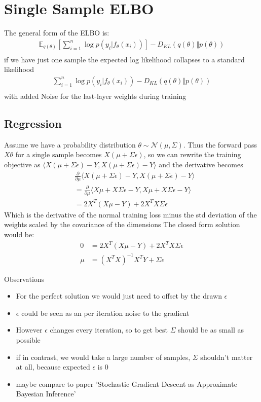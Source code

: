 \documentclass[a4paper]{scrartcl}
\begin{document}
\section{Single Sample ELBO}
  The general form of the ELBO is:
  \begin{align*}
      \mathbb{E}_{q(\theta)}[\sum_{i=1}^n \log{p(y_i \vert f_{\theta}(x_i))}] - D_{KL}(q(\theta) \Vert p(\theta))\\
  \end{align*}
  if we have just one sample the expected log likelihood collapses to a standard likelihood
  \begin{align*}
    \sum_{i=1}^n \log{p(y_i \vert f_{\theta}(x_i))} - D_{KL}(q(\theta) \Vert p(\theta))\\
  \end{align*}
  with added Noise for the last-layer weights during training

  \subsection{Regression}
    Assume we have a probability distribution $\theta \sim \mathcal{N}(\mu,
    \Sigma)$.
     Thus the forward pass $X\theta$ for a single sample becomes $X
    (\mu + \Sigma \epsilon)$, so we can rewrite the training objective as
    $\langle X (\mu + \Sigma \epsilon) - Y, X (\mu + \Sigma \epsilon) - Y\rangle$ and the derivative becomes
    \begin{align*}
      &\frac{\partial}{\partial \mu}\langle X (\mu + \Sigma \epsilon) - Y, X (\mu + \Sigma \epsilon) -Y \rangle\\
      &= \frac{\partial}{\partial \mu}\langle X \mu + X\Sigma \epsilon - Y, X \mu + X\Sigma \epsilon -Y \rangle\\
      &= 2X^T(X \mu  - Y) + 2 X^T X \Sigma \epsilon
    \end{align*}
    Which is the derivative of the normal training loss minus the std deviation
    of the weights scaled by the covariance of the dimensions
    The closed form solution would be:
    \begin{align*}
      0 &= 2X^T(X \mu  - Y) + 2 X^T X \Sigma \epsilon\\
      \mu &= (X^T X)^{-1} X^T Y + \Sigma \epsilon
    \end{align*}

    Observations
    \begin{itemize}
      \item For the perfect solution we would just need to offset by the drawn $\epsilon$
      \item $\epsilon$ could be seen as an per iteration noise to the gradient
      \item However $\epsilon$ changes every iteration, so to get best $\Sigma$ should be as small as possible
      \item if in contrast, we would take a large number of samples, $\Sigma$ shouldn't matter at all, because expected $\epsilon$ is 0
      \item maybe compare to paper 'Stochastic Gradient Descent as Approximate Bayesian Inference'
    \end{itemize}
\end{document}
